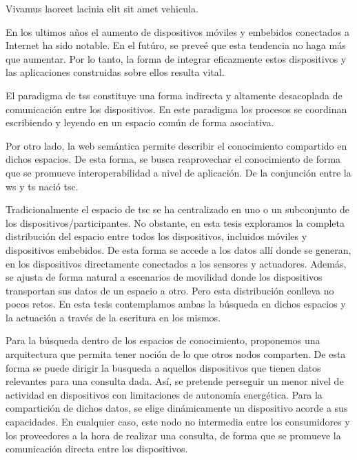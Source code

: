 




\begin{abstracts}        %

Vivamus laoreet lacinia elit sit amet vehicula.

\end{abstracts}



\begin{resumen}        %

En los ultimos años el aumento de dispositivos móviles y embebidos conectados a Internet ha sido notable.
En el futúro, se preveé que esta tendencia no haga más que aumentar.
Por lo tanto, la forma de integrar eficazmente estos dispositivos y las aplicaciones construidas sobre ellos resulta vital.


El paradigma de \aclp{ts} constituye una forma indirecta y altamente desacoplada de comunicación entre los dispositivos.
En este paradigma los procesos se coordinan escribiendo y leyendo en un espacio común de forma asociativa.


Por otro lado, la web semántica permite describir el conocimiento compartido en dichos espacios.
De esta forma, se busca reaprovechar el conocimiento de forma que se promueve interoperabilidad a nivel de aplicación.
De la conjunción entre la \acf{ws} y \acf{ts} nació \ac{tsc}.


Tradicionalmente el espacio de \ac{tsc} se ha centralizado en uno o un subconjunto de los dispositivos/participantes.
No obstante, en esta tesis exploramos la completa distribución del espacio entre todos los dispositivos, incluidos móviles y dispositivos embebidos.
De esta forma se accede a los datos allí donde se generan, en los dispositivos directamente conectados a los sensores y actuadores.
Además, se ajusta de forma natural a escenarios de movilidad donde los dispositivos transportan sus datos de un espacio a otro.
Pero esta distribución conlleva no pocos retos.
En esta tesis contemplamos ambas la búsqueda en dichos espacios y la actuación a través de la escritura en los mismos.


Para la búsqueda dentro de los espacios de conocimiento, proponemos una arquitectura que permita tener noción de lo que otros nodos comparten.
De esta forma se puede dirigir la busqueda a aquellos dispositivos que tienen datos relevantes para una consulta dada.
Así, se pretende perseguir un menor nivel de actividad en dispositivos con limitaciones de autonomía energética.
Para la compartición de dichos datos, se elige dinámicamente un dispositivo acorde a sus capacidades.
En cualquier caso, este nodo no intermedia entre los consumidores y los proveedores a la hora de realizar una consulta, de forma que se promueve la comunicación directa entre los dispositivos.



\end{resumen}
